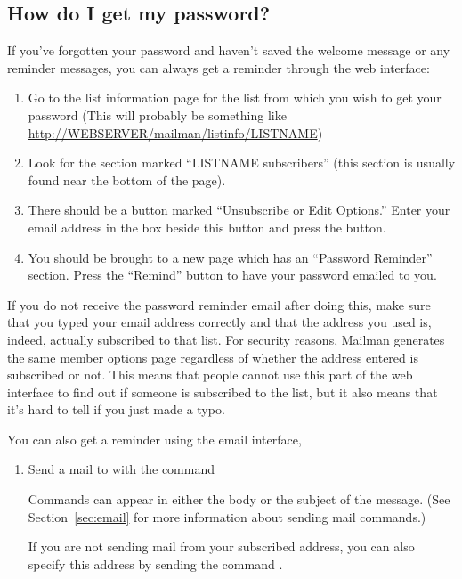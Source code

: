 \documentclass{howto}
\begin{document}
\subsection{How do I get my password?\label{sec:getpassword}}
If you've forgotten your password and haven't saved the welcome message or 
any reminder messages, you can always get a reminder through the web interface:

\begin{enumerate}
	\item Go to the list information page for the list from which you wish to 
	get your password
	(This will probably be something like 
	\url{http://WEBSERVER/mailman/listinfo/LISTNAME})
	\item Look for the section marked ``LISTNAME subscribers'' 
	(this section is usually found near the bottom of the page).
	\item There should be a button marked ``Unsubscribe or Edit Options.''  
	Enter your email address in the box beside this button and press the
	button.
	\item You should be brought to a new page which has an ``Password 
	Reminder'' section.  Press the ``Remind'' button to have your password
	emailed to you.
\end{enumerate}

If you do not receive the password reminder email after doing this, make sure 
that you typed your
email address correctly and that the address you used is, indeed, actually
subscribed to that list.  For security reasons, Mailman generates the same
member options page regardless of whether the address entered is subscribed
or not.  This means that people cannot use this part of the web interface to
find out if someone is subscribed to the list, but it also means that it's
hard to tell if you just made a typo.

You can also get a reminder using the email interface, 
\begin{enumerate}
	\item Send a mail to  with the command 

	Commands can appear
	in either the body or the subject of the message.  (See 
	Section~\ref{sec:email} for more information about sending mail
	commands.)  

	If you are not sending mail from your subscribed address, you can also
	specify this address by sending the command .
\end{enumerate}
\end{document}
